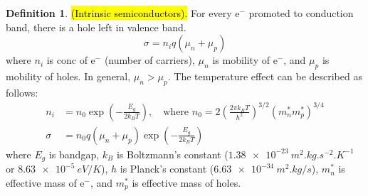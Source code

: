 \documentclass{article}
\theoremstyle{definition}
\newtheorem{definition}{Definition}[section]
\begin{document}
\begin{definition}
    \hl{(Intrinsic semiconductors).} For every e$^-$ promoted to conduction band, there is a hole left in valence band.
    \begin{equation}
        \sigma = n_i q(\mu_n + \mu_p)
    \end{equation}
    where $n_i$ is conc of e$^-$ (number of carriers), $\mu_n$ is mobility of e$^-$, and $\mu_p$ is mobility of holes. In general, $\mu_n > \mu_p$. The temperature effect can be described as follows:
    \begin{align}
        n_i &= n_0 \exp \left( -\frac{E_g}{2k_B T} \right), \quad \text{where } n_0 = 2 \left( \frac{2 \pi k_B T}{h^2} \right)^{3/2} (m_n^* m_p^*)^{3/4} \\
        \sigma &= n_0 q (\mu_n + \mu_p) \exp \left( -\frac{E_g}{2k_B T} \right)
    \end{align}
    where $E_g$ is bandgap, $k_B$ is Boltzmann's constant ($\SI{1.38e-23}{m^2.kg.s^{-2}. K^{-1}}$ or $\SI{8.63e-5}{eV/K}$), $h$ is Planck's constant ($\SI{6.63e-34}{m^2.kg/s}$), $m_n^*$ is effective mass of e$^-$, and $m_p^*$ is effective mass of holes.
\end{definition}
\end{document}
